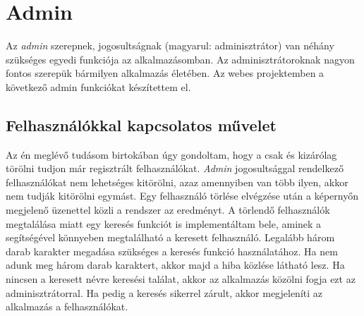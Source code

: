 \documentclass[]{thesis-ekf}
\theoremstyle{definition}
\theoremstyle{remark}
\begin{document}
	\section{Admin}
		Az \emph{admin} szerepnek, jogosultságnak (magyarul: adminisztrátor) van néhány szükséges egyedi funkciója az alkalmazásomban. Az adminisztrátoroknak nagyon fontos szerepük bármilyen alkalmazás életében. Az webes projektemben a következő admin funkciókat készítettem el.
	\subsection{Felhasználókkal kapcsolatos művelet}
		Az én meglévő tudásom birtokában úgy gondoltam, hogy a csak és kizárólag törölni tudjon már regisztrált felhasználókat. \emph{Admin} jogosultsággal rendelkező felhasználókat nem lehetséges kitörölni, azaz amennyiben van több ilyen, akkor nem tudják kitörölni egymást. Egy felhasználó törlése elvégzése után a képernyőn megjelenő üzenettel közli a rendszer az eredményt. A törlendő felhasználók megtalálása miatt egy keresés funkciót is implementáltam bele, aminek a segítségével könnyeben megtalálható a keresett felhasználó. Legalább három darab karakter megadása szükséges a keresés funkció használatához. Ha nem adunk meg három darab karaktert, akkor majd a hiba közlése látható lesz. Ha nincsen a keresett névre keresési találat, akkor az alkalmazás közölni fogja ezt az adminisztrátorral. Ha pedig a keresés sikerrel zárult, akkor megjeleníti az alkalmazás a felhasználókat.
\end{document}
